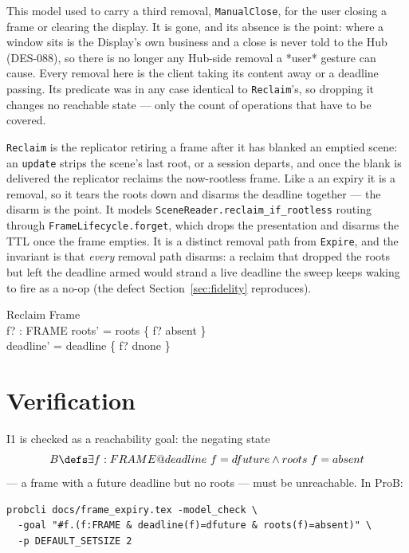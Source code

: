 \documentclass[a4paper,10pt,fleqn]{article}
\begin{document}
This model used to carry a third removal, \texttt{ManualClose}, for the user
closing a frame or clearing the display. It is gone, and its absence is the
point: where a window sits is the Display's own business and a close is never
told to the Hub (DES-088), so there is no longer any Hub-side removal a *user*
gesture can cause. Every removal here is the client taking its content away or
a deadline passing. Its predicate was in any case identical to
\texttt{Reclaim}'s, so dropping it changes no reachable state --- only the
count of operations that have to be covered.

\texttt{Reclaim} is the replicator retiring a frame after it has blanked an emptied
scene: an \texttt{update} strips the scene's last root, or a session departs, and
once the blank is delivered the replicator reclaims the now-rootless frame. Like a
an expiry it is a removal, so it tears the roots down and disarms the deadline
together --- the disarm is the point. It models
\texttt{SceneReader.reclaim\_if\_rootless} routing through
\texttt{FrameLifecycle.forget}, which drops the presentation and disarms the TTL
once the frame empties. It is a distinct removal path from \texttt{Expire},
and the invariant is that \emph{every} removal path disarms: a
reclaim that dropped the roots but left the deadline armed would strand a live
deadline the sweep keeps waking to fire as a no-op (the defect
Section~\ref{sec:fidelity} reproduces).

\begin{schema}{Reclaim}
  \Delta Frame \\
  f? : FRAME
\where
  roots' = roots \oplus \{ f? \mapsto absent \} \\
  deadline' = deadline \oplus \{ f? \mapsto dnone \}
\end{schema}

\section{Verification}

I1 is checked as a reachability goal: the negating state
\[
  B \defs \exists f : FRAME @ deadline~f = dfuture \land roots~f = absent
\]
--- a frame with a future deadline but no roots --- must be unreachable. In ProB:

\begin{verbatim}
probcli docs/frame_expiry.tex -model_check \
  -goal "#f.(f:FRAME & deadline(f)=dfuture & roots(f)=absent)" \
  -p DEFAULT_SETSIZE 2
\end{verbatim}
\end{document}
